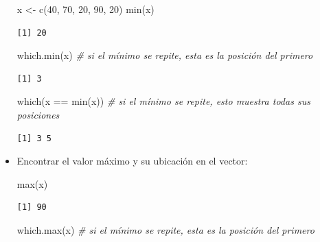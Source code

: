 \documentclass[
]{book}
\newenvironment{Shaded}{\begin{snugshade}}{\end{snugshade}}
\newcommand{\CommentTok}[1]{\textcolor[rgb]{0.56,0.35,0.01}{\textit{#1}}}
\newcommand{\DecValTok}[1]{\textcolor[rgb]{0.00,0.00,0.81}{#1}}
\newcommand{\FunctionTok}[1]{\textcolor[rgb]{0.00,0.00,0.00}{#1}}
\newcommand{\NormalTok}[1]{#1}
\newcommand{\OtherTok}[1]{\textcolor[rgb]{0.56,0.35,0.01}{#1}}
\newcommand{\SpecialCharTok}[1]{\textcolor[rgb]{0.00,0.00,0.00}{#1}}
\begin{document}
\begin{itemize}
\begin{Shaded}
\begin{Highlighting}[]
\NormalTok{x }\OtherTok{\textless{}{-}} \FunctionTok{c}\NormalTok{(}\DecValTok{40}\NormalTok{, }\DecValTok{70}\NormalTok{, }\DecValTok{20}\NormalTok{, }\DecValTok{90}\NormalTok{, }\DecValTok{20}\NormalTok{)}
\FunctionTok{min}\NormalTok{(x)}
\end{Highlighting}
\end{Shaded}

\begin{verbatim}
[1] 20
\end{verbatim}

\begin{Shaded}
\begin{Highlighting}[]
\FunctionTok{which.min}\NormalTok{(x) }\CommentTok{\# si el mínimo se repite, esta es la posición del primero}
\end{Highlighting}
\end{Shaded}

\begin{verbatim}
[1] 3
\end{verbatim}

\begin{Shaded}
\begin{Highlighting}[]
\FunctionTok{which}\NormalTok{(x }\SpecialCharTok{==} \FunctionTok{min}\NormalTok{(x)) }\CommentTok{\# si el mínimo se repite, esto muestra todas sus posiciones}
\end{Highlighting}
\end{Shaded}

\begin{verbatim}
[1] 3 5
\end{verbatim}
\item
  Encontrar el valor máximo y su ubicación en el vector:

\begin{Shaded}
\begin{Highlighting}[]
\FunctionTok{max}\NormalTok{(x)}
\end{Highlighting}
\end{Shaded}

\begin{verbatim}
[1] 90
\end{verbatim}

\begin{Shaded}
\begin{Highlighting}[]
\FunctionTok{which.max}\NormalTok{(x) }\CommentTok{\# si el mínimo se repite, esta es la posición del primero}
\end{Highlighting}
\end{Shaded}


\end{itemize}
\end{document}
